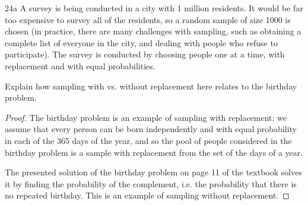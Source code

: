 \begin{exercise}{24a}
A survey is being conducted in a city with 1 million residents. It would be far too
expensive to survey all of the residents, so a random sample of size 1000 is chosen
(in practice, there are many challenges with sampling, such as obtaining a complete
list of everyone in the city, and dealing with people who refuse to participate). The
survey is conducted by choosing people one at a time, with replacement and with equal
probabilities.

Explain how sampling with vs. without replacement here relates to the birthday
problem.
\end{exercise}

\begin{proof}
    The birthday problem is an example of sampling with replacement: we assume that every person can be born independently and with equal probability in each of the 365 days of the year, and so the pool of people considered in the birthday problem is a sample with replacement from the set of the days of a year.

    The presented solution of the birthday problem on page 11 of the textbook solves it by finding the probability of the complement, i.e. the probability that there is no repeated birthday. This is an example of sampling without replacement.
\end{proof}

